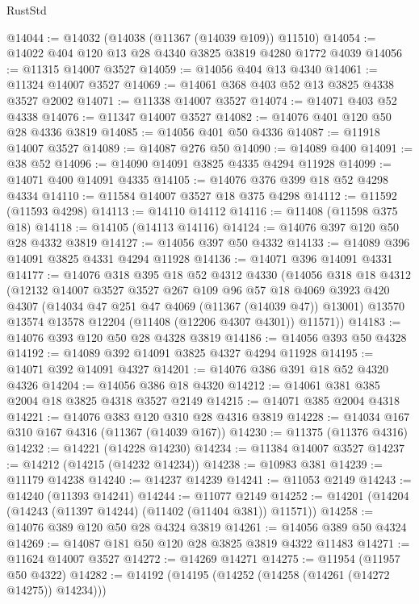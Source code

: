 \begin{lexlean}{RustStd}
\begin{coremodule}
@14044 := @14032 (@14038 (@11367 (@14039 @109)) @11510)
@14054 := @14022 @404 @120 @13 @28 @4340 @3825 @3819 @4280 @1772 @4039
@14056 := @11315 @14007 @3527
@14059 := @14056 @404 @13 @4340
@14061 := @11324 @14007 @3527
@14069 := @14061 @368 @403 @52 @13 @3825 @4338 @3527 @2002
@14071 := @11338 @14007 @3527
@14074 := @14071 @403 @52 @4338
@14076 := @11347 @14007 @3527
@14082 := @14076 @401 @120 @50 @28 @4336 @3819
@14085 := @14056 @401 @50 @4336
@14087 := @11918 @14007 @3527
@14089 := @14087 @276 @50
@14090 := @14089 @400
@14091 := @38 @52
@14096 := @14090 @14091 @3825 @4335 @4294 @11928
@14099 := @14071 @400 @14091 @4335
@14105 := @14076 @376 @399 @18 @52 @4298 @4334
@14110 := @11584 @14007 @3527 @18 @375 @4298
@14112 := @11592 (@11593 @4298)
@14113 := @14110 @14112
@14116 := @11408 (@11598 @375 @18)
@14118 := @14105 (@14113 @14116)
@14124 := @14076 @397 @120 @50 @28 @4332 @3819
@14127 := @14056 @397 @50 @4332
@14133 := @14089 @396 @14091 @3825 @4331 @4294 @11928
@14136 := @14071 @396 @14091 @4331
@14177 := @14076
    @318
    @395
    @18
    @52
    @4312
    @4330
    (@14056
      @318
      @18
      @4312
      (@12132
        @14007
        @3527
        @3527
        @267
        @109
        @96
        @57
        @18
        @4069
        @3923
        @420
        @4307
        (@14034 @47 @251 @47 @4069 (@11367 (@14039 @47)) @13001)
        @13570
        @13574
        @13578
        @12204
        (@11408 (@12206 @4307 @4301))
        @11571))
@14183 := @14076 @393 @120 @50 @28 @4328 @3819
@14186 := @14056 @393 @50 @4328
@14192 := @14089 @392 @14091 @3825 @4327 @4294 @11928
@14195 := @14071 @392 @14091 @4327
@14201 := @14076 @386 @391 @18 @52 @4320 @4326
@14204 := @14056 @386 @18 @4320
@14212 := @14061 @381 @385 @2004 @18 @3825 @4318 @3527 @2149
@14215 := @14071 @385 @2004 @4318
@14221 := @14076 @383 @120 @310 @28 @4316 @3819
@14228 := @14034 @167 @310 @167 @4316 (@11367 (@14039 @167))
@14230 := @11375 (@11376 @4316)
@14232 := @14221 (@14228 @14230)
@14234 := @11384 @14007 @3527
@14237 := @14212 (@14215 (@14232 @14234))
@14238 := @10983 @381
@14239 := @11179 @14238
@14240 := @14237 @14239
@14241 := @11053 @2149
@14243 := @14240 (@11393 @14241)
@14244 := @11077 @2149
@14252 := @14201 (@14204 (@14243 (@11397 @14244) (@11402 (@11404 @381)) @11571))
@14258 := @14076 @389 @120 @50 @28 @4324 @3819
@14261 := @14056 @389 @50 @4324
@14269 := @14087 @181 @50 @120 @28 @3825 @3819 @4322 @11483
@14271 := @11624 @14007 @3527
@14272 := @14269 @14271
@14275 := @11954 (@11957 @50 @4322)
@14282 := @14192 (@14195 (@14252 (@14258 (@14261 (@14272 @14275)) @14234)))

\end{coremodule}
\end{lexlean}

